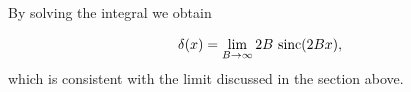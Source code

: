 By solving the integral we obtain

\[
\delta(x)
=
\lim_{B\rightarrow\infty}
2B\,\operatorname{sinc}(2Bx),
\]
which is consistent with the limit discussed in the section above.










